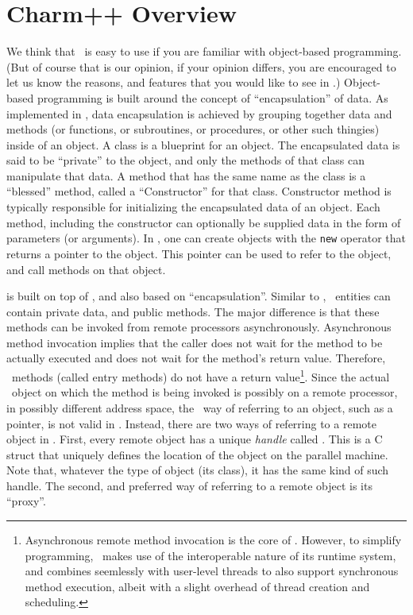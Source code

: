 \chapter{Charm++ Overview}

We think that \charmpp\ is easy to use if you are familiar with object-based
programming. (But of course that is our opinion, if your opinion differs, you
are encouraged to let us know the reasons, and features that you would like to
see in \charmpp.) Object-based programming is built around the concept of
``encapsulation'' of data. As implemented in \CC, data encapsulation is
achieved by grouping together data and methods (or functions, or subroutines,
or procedures, or other such thingies) inside of an object. A class is a
blueprint for an object.  The encapsulated data is said to be ``private'' to
the object, and only the methods of that class can manipulate that data. A
method that has the same name as the class is a ``blessed'' method, called a
``Constructor'' for that class.  Constructor method is typically responsible
for initializing the encapsulated data of an object. Each method, including the
constructor can optionally be
supplied data in the form of parameters (or arguments). In \CC, one can create objects with the {\tt new} operator that returns a pointer to the object. This pointer can be used to refer to the object, and call methods on that object.

\charmpp is built on top of \CC, and also based on ``encapsulation''. Similar
to \CC, \charmpp\ entities can contain private data, and public methods. The
major difference is that these methods can be invoked from remote processors
asynchronously.  Asynchronous method invocation implies that the caller does
not wait for the method to be actually executed and does not wait for the
method's return value. Therefore, \charmpp\ methods (called entry methods) do
not have a return value\footnote{Asynchronous remote method invocation is the
core of \charmpp. However, to simplify programming, \charmpp\ makes use of the
interoperable nature of its runtime system, and combines seemlessly with
user-level threads to also support synchronous method execution, albeit with a
slight overhead of thread creation and scheduling.}. Since the actual \charmpp\
object on which the method is being invoked is possibly on a remote processor,
in possibly different address space, the \CC\ way of referring to an object,
such as a pointer, is not valid in \charmpp.  Instead, there are two ways of
referring to a remote object in \charmpp. First, every remote object has a
unique {\em handle} called \kw{ChareID}. This is a C struct that uniquely
defines the location of the object on the parallel machine. Note that, whatever
the type of object (its class), it has the same kind of such handle. The
second, and preferred way of referring to a remote object is its ``proxy''.

